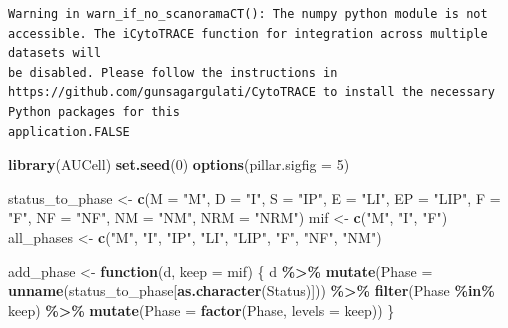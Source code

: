 \documentclass[
  landscape]{article}
\newenvironment{Shaded}{\begin{snugshade}}{\end{snugshade}}
\newcommand{\AttributeTok}[1]{\textcolor[rgb]{0.13,0.29,0.53}{#1}}
\newcommand{\ControlFlowTok}[1]{\textcolor[rgb]{0.13,0.29,0.53}{\textbf{#1}}}
\newcommand{\DecValTok}[1]{\textcolor[rgb]{0.00,0.00,0.81}{#1}}
\newcommand{\FunctionTok}[1]{\textcolor[rgb]{0.13,0.29,0.53}{\textbf{#1}}}
\newcommand{\NormalTok}[1]{#1}
\newcommand{\OtherTok}[1]{\textcolor[rgb]{0.56,0.35,0.01}{#1}}
\newcommand{\SpecialCharTok}[1]{\textcolor[rgb]{0.81,0.36,0.00}{\textbf{#1}}}
\newcommand{\StringTok}[1]{\textcolor[rgb]{0.31,0.60,0.02}{#1}}
\begin{document}
\begin{verbatim}
Warning in warn_if_no_scanoramaCT(): The numpy python module is not accessible. The iCytoTRACE function for integration across multiple datasets will
be disabled. Please follow the instructions in https://github.com/gunsagargulati/CytoTRACE to install the necessary Python packages for this
application.FALSE
\end{verbatim}

\begin{Shaded}
\begin{Highlighting}[]
\FunctionTok{library}\NormalTok{(AUCell)}
\FunctionTok{set.seed}\NormalTok{(}\DecValTok{0}\NormalTok{)}
\FunctionTok{options}\NormalTok{(}\AttributeTok{pillar.sigfig =} \DecValTok{5}\NormalTok{)}

\NormalTok{status\_to\_phase }\OtherTok{\textless{}{-}} \FunctionTok{c}\NormalTok{(}\AttributeTok{M =} \StringTok{"M"}\NormalTok{, }\AttributeTok{D =} \StringTok{"I"}\NormalTok{, }\AttributeTok{S =} \StringTok{"IP"}\NormalTok{, }\AttributeTok{E =} \StringTok{"LI"}\NormalTok{, }\AttributeTok{EP =} \StringTok{"LIP"}\NormalTok{,}
                     \AttributeTok{F =} \StringTok{"F"}\NormalTok{, }\AttributeTok{NF =} \StringTok{"NF"}\NormalTok{, }\AttributeTok{NM =} \StringTok{"NM"}\NormalTok{, }\AttributeTok{NRM =} \StringTok{"NRM"}\NormalTok{)}
\NormalTok{mif }\OtherTok{\textless{}{-}} \FunctionTok{c}\NormalTok{(}\StringTok{"M"}\NormalTok{, }\StringTok{"I"}\NormalTok{, }\StringTok{"F"}\NormalTok{)}
\NormalTok{all\_phases }\OtherTok{\textless{}{-}} \FunctionTok{c}\NormalTok{(}\StringTok{"M"}\NormalTok{, }\StringTok{"I"}\NormalTok{, }\StringTok{"IP"}\NormalTok{, }\StringTok{"LI"}\NormalTok{, }\StringTok{"LIP"}\NormalTok{, }\StringTok{"F"}\NormalTok{, }\StringTok{"NF"}\NormalTok{, }\StringTok{"NM"}\NormalTok{)}

\NormalTok{add\_phase }\OtherTok{\textless{}{-}} \ControlFlowTok{function}\NormalTok{(d, }\AttributeTok{keep =}\NormalTok{ mif) \{}
\NormalTok{  d }\SpecialCharTok{\%\textgreater{}\%}
    \FunctionTok{mutate}\NormalTok{(}\AttributeTok{Phase =} \FunctionTok{unname}\NormalTok{(status\_to\_phase[}\FunctionTok{as.character}\NormalTok{(Status)])) }\SpecialCharTok{\%\textgreater{}\%}
    \FunctionTok{filter}\NormalTok{(Phase }\SpecialCharTok{\%in\%}\NormalTok{ keep) }\SpecialCharTok{\%\textgreater{}\%}
    \FunctionTok{mutate}\NormalTok{(}\AttributeTok{Phase =} \FunctionTok{factor}\NormalTok{(Phase, }\AttributeTok{levels =}\NormalTok{ keep))}
\NormalTok{\}}


\end{Highlighting}
\end{Shaded}
\end{document}
